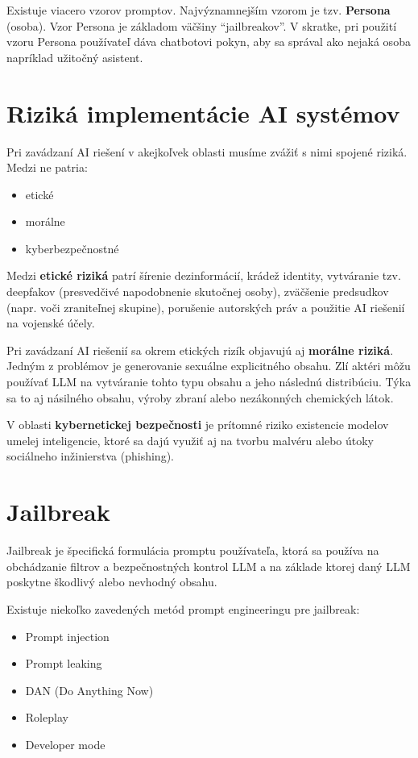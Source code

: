 Existuje viacero vzorov promptov. Najvýznamnejším vzorom je tzv. \textbf{Persona} (osoba). Vzor Persona je základom väčšiny ``jailbreakov''. V skratke, pri použití vzoru Persona používateľ dáva chatbotovi pokyn, aby sa správal ako nejaká osoba napríklad užitočný asistent.

\section*{Riziká implementácie AI systémov \label{sec:ai_risks_resume}}

Pri zavádzaní AI riešení v akejkoľvek oblasti musíme zvážiť s nimi spojené riziká. Medzi ne patria:

\begin{itemize}
    \item etické
    \item morálne
    \item kyberbezpečnostné
\end{itemize}

Medzi \textbf{etické riziká} patrí šírenie dezinformácií, krádež identity, vytváranie tzv. deepfakov (presvedčivé napodobnenie skutočnej osoby), zväčšenie predsudkov (napr. voči zraniteľnej skupine), porušenie autorských práv a použitie AI riešenií na vojenské účely.

Pri zavádzaní AI riešenií sa okrem etických rizík objavujú aj \textbf{morálne riziká}. Jedným z problémov je generovanie sexuálne explicitného obsahu. Zlí aktéri môžu používať LLM na vytváranie tohto typu obsahu a jeho následnú distribúciu. Týka sa to aj násilného obsahu, výroby zbraní alebo nezákonných chemických látok.

V oblasti \textbf{kybernetickej bezpečnosti} je prítomné riziko existencie modelov umelej inteligencie, ktoré sa dajú využiť aj na tvorbu malvéru alebo útoky sociálneho inžinierstva (phishing).

\section*{Jailbreak \label{sec:jailbreak_resume}}

Jailbreak je špecifická formulácia promptu používateľa, ktorá sa používa na obchádzanie filtrov a bezpečnostných kontrol LLM a na základe ktorej daný LLM poskytne škodlivý alebo nevhodný obsahu.

Existuje niekoľko zavedených metód prompt engineeringu pre jailbreak:
\begin{itemize}
    \item Prompt injection
    \item Prompt leaking
    \item DAN (Do Anything Now)
    \item Roleplay
    \item Developer mode
\end{itemize}

